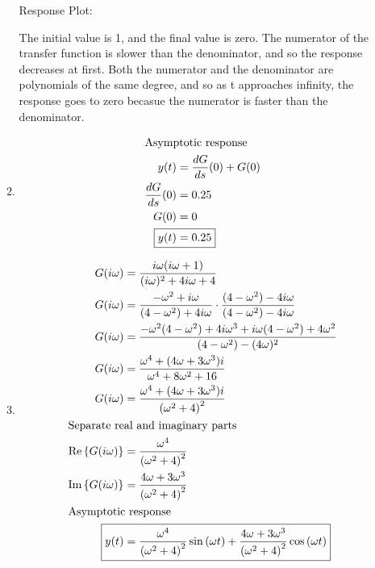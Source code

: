 \documentclass[12pt]{article}
\begin{document}
\begin{enumerate}
\begin{enumerate}
        Response Plot:

        \begin{center}
            
        \end{center}

        The initial value is 1, and the final value is zero. The numerator of the transfer function is slower than the denominator, and so the response decreases at first. Both the numerator and the denominator are polynomials of the same degree, and so as t approaches infinity, the response goes to zero becasue the numerator is faster than the denominator. 

        \item 
        \begin{align*}
            \intertext{Asymptotic response}
            y(t) &= \frac{dG}{ds}(0) + G(0) \\
            \frac{dG}{ds}(0) &= 0.25 \\
            G(0) &= 0 \\
            \Aboxed{y(t) &= 0.25} 
        \end{align*}

        \item 
        \begin{align*}
            G(i\omega) &= \frac{i\omega (i\omega + 1)}{(i\omega)^2 + 4i\omega + 4} \\
            G(i\omega) &= \frac{-\omega^2 + i\omega}{(4 - \omega^2) + 4i\omega} \cdot \frac{(4 - \omega^2) - 4i\omega}{(4 - \omega^2) - 4i\omega} \\ 
            G(i\omega) &= \frac{-\omega^2 (4 - \omega^2) + 4i\omega^3 + i\omega (4 - \omega^2) + 4\omega^2}{(4 - \omega^2) - (4\omega)^2} \\
            G(i\omega) &= \frac{\omega^4 + (4\omega + 3\omega^3) i}{\omega^4 + 8\omega^2 + 16} \\
            G(i\omega) &= \frac{\omega^4 + (4\omega + 3\omega^3) i}{\left(\omega^2 + 4\right)^2} \\
            \intertext{Separate real and imaginary parts}
            \text{Re} \left\{G(i\omega)\right\} &= \frac{\omega^4}{\left(\omega^2 + 4\right)^2} \\
            \text{Im} \left\{G(i\omega)\right\} &= \frac{4\omega + 3\omega^3}{\left(\omega^2 + 4\right)^2} \\
            \intertext{Asymptotic response}
            \Aboxed{y(t) &= \frac{\omega^4}{\left(\omega^2 + 4\right)^2} \sin\left(\omega t\right) + \frac{4\omega + 3\omega^3}{\left(\omega^2 + 4\right)^2} \cos\left(\omega t\right)}
        \end{align*}


\end{enumerate}
\end{enumerate}
\end{document}
